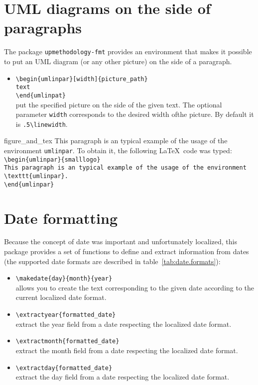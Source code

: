 \documentclass[book,taskpackage,specpackage,codepackage]{upmethodology-document}
\begin{document}
\section{UML diagrams on the side of paragraphs}

The package \texttt{upmethodology-fmt} provides an environment that makes it possible to put an UML diagram (or any other picture) on the side of a paragraph.

\begin{itemize}
\item \texttt{{\textbackslash}begin\{umlinpar\}[width]\{picture\_path\}}\\\texttt{text}\\\texttt{{\textbackslash}end\{umlinpat\}} \\
	put the specified picture on the side of the given text. The optional parameter \texttt{width} corresponds to the desired width ofthe picture. By default it is \texttt{.5{\textbackslash}linewidth}.
\end{itemize}

\begin{umlinpar}{figure_and_tex}
	This paragraph is an typical example of the usage of the environment \texttt{umlinpar}. To obtain it, the following \LaTeX\ code was typed: \\
\texttt{{\textbackslash}begin\{umlinpar\}\{smalllogo\}} \\
\texttt{This paragraph is an typical example of the usage of the environment {\textbackslash}texttt\{umlinpar\}.} \\
\texttt{{\textbackslash}end\{umlinpar\}} \\
\end{umlinpar}

\section{Date formatting}

Because the concept of date was important and unfortunately localized, this package provides a set of functions to define and extract information from dates (the supported date formats are described in table~\ref{tab:date.formats}):

\begin{itemize}
\item \texttt{{\textbackslash}makedate\{day\}\{month\}\{year\}}\\
allows you to create the text corresponding to the given date according to the current localized date format.
\item \texttt{{\textbackslash}extractyear\{formatted\_date\}}\\
extract the year field from a date respecting the localized date format.
\item \texttt{{\textbackslash}extractmonth\{formatted\_date\}}\\
extract the month field from a date respecting the localized date format.
\item \texttt{{\textbackslash}extractday\{formatted\_date\}}\\
extract the day field from a date respecting the localized date format.
\end{itemize}
\end{document}
